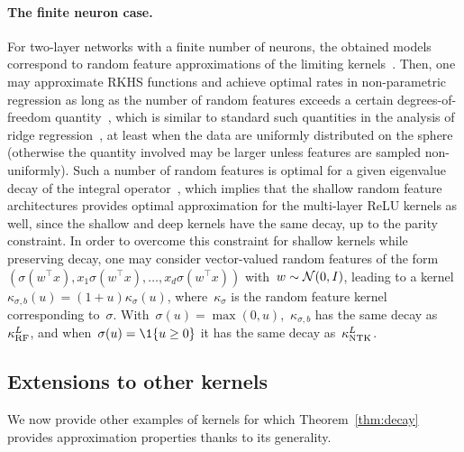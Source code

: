\paragraph{The finite neuron case.}
For two-layer networks with a finite number of neurons, the obtained models correspond to random feature approximations of the limiting kernels~\citep{rahimi2007}.
Then, one may approximate RKHS functions and achieve optimal rates in non-parametric regression as long as the number of random features exceeds a certain degrees-of-freedom quantity~\citep{bach2017equivalence,rudi2017generalization}, which is similar to standard such quantities in the analysis of ridge regression~\citep{caponnetto2007optimal}, at least when the data are uniformly distributed on the sphere (otherwise the quantity involved may be larger unless features are sampled non-uniformly).
Such a number of random features is optimal for a given eigenvalue decay of the integral operator~\citep{bach2017equivalence}, which implies that the shallow random feature architectures provides optimal approximation for the multi-layer ReLU kernels as well, since the shallow and deep kernels have the same decay, up to the parity constraint.
In order to overcome this constraint for shallow kernels while preserving decay, one may consider vector-valued random features of the form~$(\sigma(w^\top x), x_1 \sigma(w^\top x), \ldots, x_d \sigma(w^\top x))$ with~$w \sim {\mathcal N}(0, I)$, leading to a kernel~$\kappa_{\sigma,b}(u) = (1 + u) \kappa_\sigma(u)$, where~$\kappa_\sigma$ is the random feature kernel corresponding to~$\sigma$.
With~$\sigma(u) = \max(0,u)$,~$\kappa_{\sigma,b}$ has the same decay as~$\kappa^L_{{\text{RF}}}$, and when~$\sigma(u) = \1\{u \geq 0\}$ it has the same decay as~$\kappa^L_{{\text{NTK}}}$.


\subsection{Extensions to other kernels}
\label{sub:extensions}

We now provide other examples of kernels for which Theorem~\ref{thm:decay} provides approximation properties thanks to its generality.

